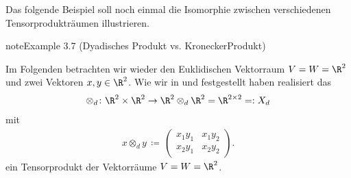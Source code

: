 \documentclass[letterpaper,10pt,english]{jupyterBook}
\begin{document}
\sphinxAtStartPar
Das folgende Beispiel soll noch einmal die Isomorphie zwischen verschiedenen Tensorprodukträumen illustrieren.
\label{vektoranalysis/tensor:example-9}
\begin{sphinxadmonition}{note}{Example 3.7 (Dyadisches Produkt vs. Kronecker\sphinxhyphen{}Produkt)}



\sphinxAtStartPar
Im Folgenden betrachten wir wieder den Euklidischen Vektorraum \(V=W=\R^2\) und zwei Vektoren \(x, y \in \R^2\).
Wie wir in {\hyperref[\detokenize{vektoranalysis/tensor:ex:tensorproduktVarianten}]{}} und {\hyperref[\detokenize{vektoranalysis/tensor:ex:universelleEigenschaft}]{}} festgestellt haben realisiert das 
\begin{equation*}
\begin{split}\otimes_d \colon \R^2 \times \R^2 \rightarrow \R^2 \otimes_d \R^2 = \R^{2 \times 2} =: X_d\end{split}
\end{equation*}
\sphinxAtStartPar
mit
\begin{equation*}
\begin{split}x \otimes_d y \, \coloneqq \,
\begin{pmatrix}
x_1y_1 & x_1y_2 \\
x_2y_1 & x_2y_2
\end{pmatrix}.\end{split}
\end{equation*}
\sphinxAtStartPar
ein Tensorprodukt der Vektorräume \(V=W=\R^2\).


\end{sphinxadmonition}
\end{document}
